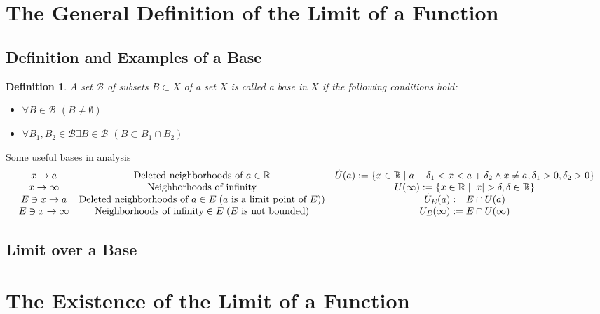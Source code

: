 \documentclass[onecolumn]{ctexart}
\newtheorem{definition}{Definition}
\begin{document}
\section{The General Definition of the Limit of a Function}

\subsection{Definition and Examples of a Base}

\begin{definition}
  A set $\mathcal{B}$ of subsets $B \subset X$ of a set $X$ is called a base in 
  $X$ if the following conditions hold:
  \begin{itemize}
    \item $\forall B \in \mathcal{B}$ $(B \neq \emptyset)$
    \item $\forall B_1, B_2 \in \mathcal{B} \exists B \in \mathcal{B}$ $(B 
    \subset B_1 \cap B_2)$
  \end{itemize}
\end{definition}

Some useful bases in analysis
\[
  \begin{matrix}
    x \to a & \textnormal{Deleted neighborhoods of } a \in \mathbb{R} & \dot{U}(a):= \lbrace x \in \mathbb{R} \mid a - \delta_1 < x < a + \delta_2 \wedge x \neq a, \delta_1 > 0, \delta_2 > 0\rbrace \\
    x \to \infty & \textnormal{Neighborhoods of infinity} & U(\infty) := \lbrace x \in \mathbb{R} \mid |x| > \delta, \delta \in \mathbb{R} \rbrace \\
    E \owns x \to a & \textnormal{Deleted neighborhoods of } a \in E \thickspace \textnormal{($a$ is a limit point of $E$)}) & \dot{U}_E(a) := E \cap \dot{U}(a) \\
    E \owns x \to \infty & \textnormal{Neighborhoods of infinity} \in E \thickspace \textnormal{($E$ is not bounded)} & U_E(\infty) := E \cap U(\infty) \\
  \end{matrix}
\]

\subsection{Limit over a Base}

\section{The Existence of the Limit of a Function}
\end{document}

